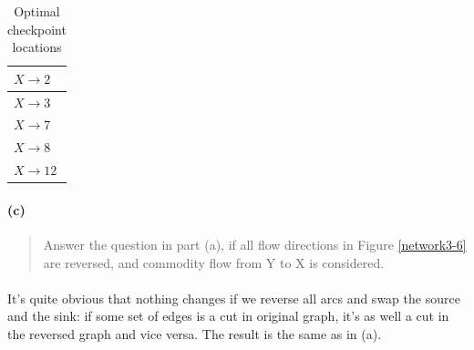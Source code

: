 \begin{table}[H]
\centering
\begin{tabular}{|l|}
\hline
$X \rightarrow 2$ \\ \hline
$X \rightarrow 3$ \\ \hline
$X \rightarrow 7$ \\ \hline
$X \rightarrow 8$ \\ \hline
$X \rightarrow 12$ \\ \hline
\end{tabular}
\caption{Optimal checkpoint locations}
\label{mincut3-6b}
\end{table}

\paragraph{(c)}
\begin{quote}
Answer the question in part (a), if all flow directions in Figure \ref{network3-6} are reversed, and commodity flow from Y to X is considered.
\end{quote}

\paragraph{}
It's quite obvious that nothing changes if we reverse all arcs and swap the source and the sink: if some set of edges is a cut in original graph, it's as well a cut in the reversed graph and vice versa. The result is the same as in (a).
